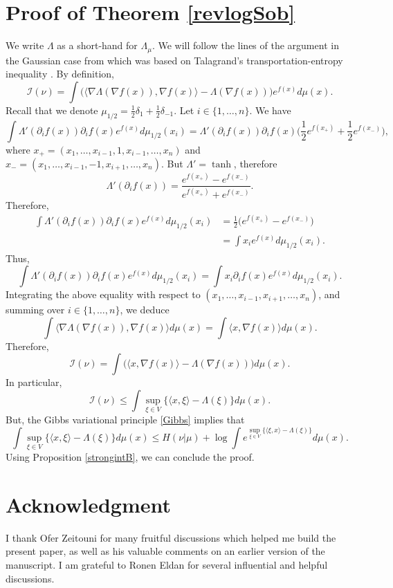 \documentclass[a4paper,oneside,11pt]{article}
\begin{document}
\section{Proof of Theorem \ref{revlogSob}}
 We write $\Lambda$ as a short-hand for $\Lambda_\mu$.
We will follow the lines of the argument in the Gaussian case from \cite [proof of Theorem 1]{LedouxE} which was based on Talagrand's transportation-entropy inequality \cite{Talagrand2}.  By definition,
$$\mathcal{I}(\nu) = \int \big( \langle \nabla \Lambda(\nabla f(x)), \nabla f(x) \rangle - \Lambda(\nabla f(x)) \big) e^{f(x)} d\mu(x).$$
Recall that we denote $\mu_{1/2} = \frac{1}{2} \delta_1 + \frac{1}{2} \delta_{-1}$. Let $i\in \{1,\ldots,n\}$. We have
$$\int \Lambda'(\partial_i f(x)) \partial_i f(x) e^{f(x)} d\mu_{1/2}(x_i) =\Lambda'(\partial_i f(x)) \partial_i f(x) \Big( \frac{1}{2}e^{f(x_+)} +\frac{1}{2}e^{f(x_-)} \Big),$$
where $x_+ = (x_1,\ldots,x_{i-1},1,x_{i-1},\ldots,x_n)$ and $x_- = (x_1,\ldots,x_{i-1},-1,x_{i+1},\ldots,x_n)$. But $\Lambda' = \tanh$, therefore
$$ \Lambda'(\partial_i f(x))= \frac{e^{f(x_+)} - e^{f(x_-)} }{e^{f(x_+)} + e^{f(x_-)}}.$$
Therefore,
\begin{align*}\int \Lambda'(\partial_i f(x)) \partial_i f(x) e^{f(x)} d\mu_{1/2}(x_i) &=\frac{1}{2}\big(e^{f(x_+)} - e^{f(x_-)} \big) \\
& =\int x_i  e^{f(x)} d\mu_{1/2}(x_i).
\end{align*}
Thus, 
$$\int \Lambda'(\partial_i f(x)) \partial_i f(x) e^{f(x)} d\mu_{1/2}(x_i) =\int x_i \partial_i f(x) e^{f(x)} d\mu_{1/2}(x_i).$$
Integrating the above equality with respect to $(x_1,\ldots,x_{i-1},x_{i+1},\ldots,x_n)$, and summing over $i\in\{1,\ldots,n\}$, we deduce 
$$ \int \langle\nabla \Lambda(\nabla f(x)), \nabla f(x) \rangle d\mu(x) = \int \langle x, \nabla f(x)\rangle d\mu(x).$$
Therefore,
$$ \mathcal{I}(\nu) = \int \big( \langle x, \nabla f(x)\rangle -\Lambda(\nabla f(x)) \big) d\mu(x).$$
In particular,
$$ \mathcal{I}(\nu) \leq  \int \sup_{\xi \in V} \big\{ \langle x, \xi \rangle -\Lambda(\xi) \big\} d\mu(x).$$
But, the Gibbs variational principle \eqref{Gibbs} implies that
$$  \int \sup_{\xi \in V} \big\{ \langle x, \xi \rangle -\Lambda(\xi) \big\} d\mu(x) \leq H(\nu|\mu) + \log \int e^{\sup_{\xi \in V} \{ \langle \xi, x\rangle - \Lambda(\xi)\}} d\mu(x).$$
Using Proposition \ref{strongintB}, we can conclude the proof.

\section*{Acknowledgment}
I thank Ofer Zeitouni for many fruitful discussions which helped me build the present paper, as well as his valuable comments on an earlier version of the manuscript. I am grateful to Ronen Eldan for several influential and helpful discussions.






{}
\end{document}

